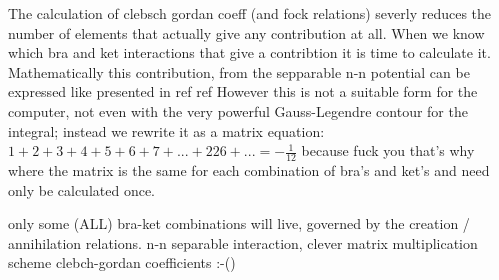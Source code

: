The calculation of clebsch gordan coeff (and fock relations) severly reduces the number of elements that actually give any contribution at all. 
When we know which bra and ket interactions that give a contribtion it is time to calculate it. 
Mathematically this contribution, from the sepparable n-n potential can be expressed like presented in ref ref
However this is not a suitable form for the computer, not even with the very powerful Gauss-Legendre contour for the integral; instead we rewrite it as a matrix equation:
$1+2+3+4+5+6+7+...+226+... = - \frac{1}{12}$ because fuck you that's why\\
where the matrix is the same for each combination of bra's and ket's and need only be calculated once.

only some (ALL) bra-ket combinations will live, governed by the creation / annihilation relations. 
n-n separable interaction, clever matrix multiplication scheme
clebch-gordan coefficients :-()